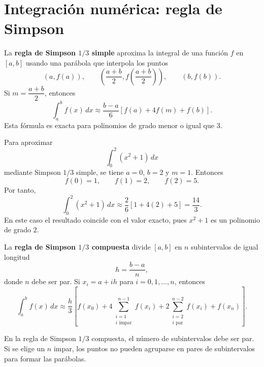 \documentclass[a4,11pt]{aleph-notas}
\begin{document}
\encabezado

\section{Integración numérica: regla de Simpson}

\begin{defi}
    La \textbf{regla de Simpson $1/3$ simple} aproxima la integral de una función $f$ en $[a,b]$ usando una parábola que interpola los puntos
    \[
        (a,f(a)),\qquad \left(\frac{a+b}{2},f\left(\frac{a+b}{2}\right)\right),\qquad (b,f(b)).
    \]
    Si $m=\dfrac{a+b}{2}$, entonces
    \[
        \int_a^b f(x)\,dx
        \approx
        \frac{b-a}{6}\left[f(a)+4f(m)+f(b)\right].
    \]
    Esta fórmula es exacta para polinomios de grado menor o igual que $3$.
\end{defi}

\begin{ejem}
    Para aproximar
    \[
        \int_0^2 (x^2+1)\,dx
    \]
    mediante Simpson $1/3$ simple, se tiene $a=0$, $b=2$ y $m=1$. Entonces
    \[
        f(0)=1,\qquad f(1)=2,\qquad f(2)=5.
    \]
    Por tanto,
    \[
        \int_0^2 (x^2+1)\,dx
        \approx
        \frac{2}{6}\left[1+4(2)+5\right]
        =
        \frac{14}{3}.
    \]
    En este caso el resultado coincide con el valor exacto, pues $x^2+1$ es un polinomio de grado $2$.
\end{ejem}

\begin{defi}
    La \textbf{regla de Simpson $1/3$ compuesta} divide $[a,b]$ en $n$ subintervalos de igual longitud
    \[
        h=\frac{b-a}{n},
    \]
    donde $n$ debe ser par. Si $x_i=a+ih$ para $i=0,1,\ldots,n$, entonces
    \[
        \int_a^b f(x)\,dx
        \approx
        \frac{h}{3}
        \left[
            f(x_0)
            +4\sum_{\substack{i=1\\ i\text{ impar}}}^{n-1}f(x_i)
            +2\sum_{\substack{i=2\\ i\text{ par}}}^{n-2}f(x_i)
            +f(x_n)
        \right].
    \]
\end{defi}

\begin{advertencia}
    En la regla de Simpson $1/3$ compuesta, el número de subintervalos debe ser par. Si se elige un $n$ impar, los puntos no pueden agruparse en pares de subintervalos para formar las parábolas.
\end{advertencia}
\end{document}

